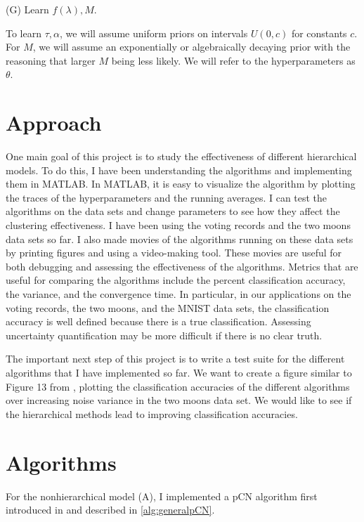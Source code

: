 \documentclass{siamart1116}
\begin{document}
(G) Learn $f(\lambda), M$.

To learn $\tau, \alpha$, we will assume uniform priors on intervals $U(0, c)$ for constants $c$. For $M$, we will assume an exponentially or algebraically decaying prior with the reasoning that larger $M$ being less likely. We will refer to the hyperparameters as $\theta$.

\section{Approach}
One main goal of this project is to study the effectiveness of different hierarchical models. To do this, I have been understanding the algorithms and implementing them in MATLAB. In MATLAB, it is easy to visualize the algorithm by plotting the traces of the hyperparameters and the running averages. I can test the algorithms on the data sets and change parameters to see how they affect the clustering effectiveness. I have been using the voting records and the two moons data sets so far. I also made movies of the algorithms running on these data sets by printing figures and using a video-making tool. These movies are useful for both debugging and assessing the effectiveness of the algorithms. Metrics that are useful for comparing the algorithms include the percent classification accuracy, the variance, and the convergence time. In particular, in our applications on the voting records, the two moons, and the MNIST data sets, the classification accuracy is well defined because there is a true classification. Assessing uncertainty quantification may be more difficult if there is no clear truth.

The important next step of this project is to write a test suite for the different algorithms that I have implemented so far. We want to create a figure similar to Figure 13 from \cite{BeLuStZy17}, plotting the classification accuracies of the different algorithms over increasing noise variance in the two moons data set. We would like to see if the hierarchical methods lead to improving classification accuracies.

\section{Algorithms}
For the nonhierarchical model (A), I implemented a pCN algorithm first introduced in \cite{BeRoStVo08} and described in \cref{alg:generalpCN}.
\end{document}
